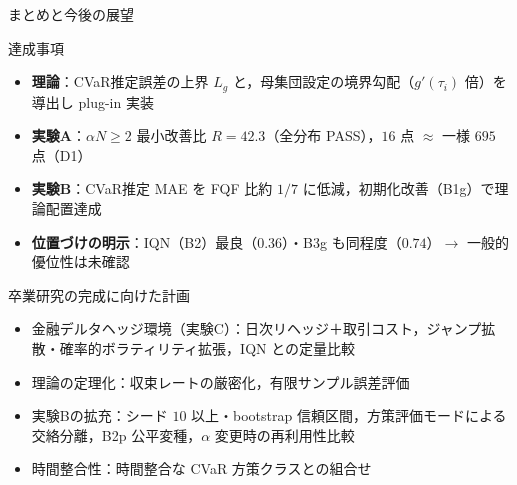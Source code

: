 \documentclass[aspectratio=169, 10pt]{beamer}
\newcommand{\blue}[1]{\textcolor{blue!80!black}{#1}}
\newcommand{\Lg}{L_g}
\begin{document}
\begin{frame}{まとめと今後の展望}
  \begin{exampleblock}{達成事項}
    \begin{itemize}
      \item \textbf{理論}：CVaR推定誤差の上界 $\Lg$ と，母集団設定の境界勾配（$g'(\tau_i)$ 倍）を導出し plug-in 実装
      \item \textbf{実験A}：$\alpha N\ge 2$ 最小改善比 \alert{$R=42.3$}（全分布 PASS），$16$ 点 $\approx$ 一様 $695$ 点（D1）
      \item \textbf{実験B}：CVaR推定 MAE を FQF 比\alert{約 $1/7$} に低減，初期化改善（B1g）で理論配置達成
      \item \textbf{位置づけの明示}：IQN（B2）最良（$0.36$）・B3g も同程度（$0.74$）$\to$ 一般的優位性は未確認
    \end{itemize}
  \end{exampleblock}
  \begin{block}{卒業研究の完成に向けた計画}
    \begin{itemize}
      \item \blue{金融デルタヘッジ環境（実験C）}：日次リヘッジ＋取引コスト，ジャンプ拡散・確率的ボラティリティ拡張，IQN との定量比較
      \item \blue{理論の定理化}：収束レートの厳密化，有限サンプル誤差評価
      \item \blue{実験Bの拡充}：シード $10$ 以上・bootstrap 信頼区間，\blue{方策評価モード}による交絡分離，B2p 公平変種，$\alpha$ 変更時の再利用性比較
      \item \blue{時間整合性}：時間整合な CVaR 方策クラスとの組合せ
    \end{itemize}
  \end{block}
\end{frame}


\appendix
\end{document}
